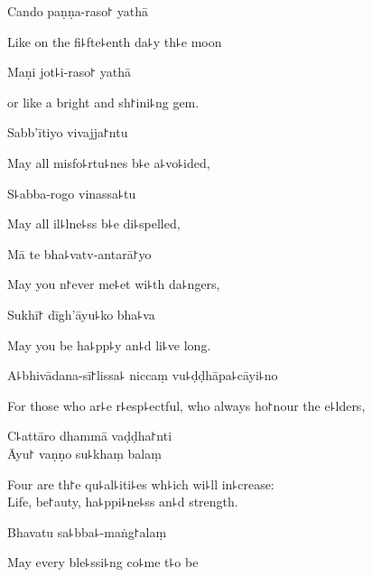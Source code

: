 Cando paṇṇa-raso꜓ yathā

\begin{english}
  Like on the fi꜕fte꜕enth da꜕y th꜕e moon
\end{english}

Maṇi jot꜕i-raso꜓ yathā

\begin{english}
  or like a bright and sh꜓ini꜕ng gem.
\end{english}

Sabb'ītiyo vivajja꜓ntu

\begin{english}
  May all misfo꜕rtu꜕nes b꜕e a꜕vo꜕ided,
\end{english}

S꜕abba-rogo vinassa꜕tu

\begin{english}
  May all il꜕lne꜕ss b꜕e di꜕spelled,
\end{english}

Mā te bha꜕vatv-antarā꜓yo

\begin{english}
  May you n꜓ever me꜕et wi꜕th da꜕ngers,
\end{english}

Sukhī꜓ dīgh'āyu꜕ko bha꜕va

\begin{english}
  May you be ha꜕pp꜕y an꜕d li꜕ve long.
\end{english}

A꜕bhivādana-sī꜓lissa꜕ niccaṃ vu꜕ḍḍhāpa꜕cāyi꜕no\\

\begin{english}
  For those who ar꜕e r꜕esp꜕ectful, who always ho꜓nour the e꜕lders,
\end{english}

C꜕attāro dhammā vaḍḍha꜓nti\\
Āyu꜓ vaṇṇo su꜕khaṃ balaṃ

\begin{english}
  Four are th꜓e qu꜕al꜕iti꜕es wh꜕ich wi꜕ll in꜕crease:\\
  Life, be꜓auty, ha꜕ppi꜕ne꜕ss an꜕d strength.
\end{english}

Bhavatu sa꜕bba꜕-maṅg꜓alaṃ

\begin{english}
  May every ble꜕ssi꜕ng co꜕me t꜕o be
\end{english}

